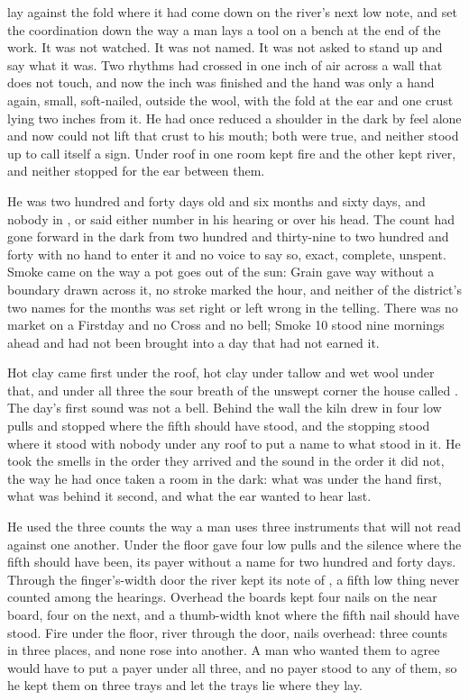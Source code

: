 
 lay against the fold where it had come down on the river's next low note, and  set the coordination down the way a man lays a tool on a bench at the end of the work. It was not watched. It was not named. It was not asked to stand up and say what it was. Two rhythms had crossed in one inch of air across a wall that does not touch, and now the inch was finished and the hand was only a hand again, small, soft-nailed, outside the wool, with the fold at the ear and one crust lying two inches from it. He had once reduced a shoulder in the dark by feel alone and now could not lift that crust to his mouth; both were true, and neither stood up to call itself a sign. Under  roof in  one room kept fire and the other kept river, and neither stopped for the ear between them.

He was two hundred and forty days old and six months and sixty days, and nobody in ,  or  said either number in his hearing or over his head. The count had gone forward in the dark from two hundred and thirty-nine to two hundred and forty with no hand to enter it and no voice to say so, exact, complete, unspent. Smoke came on the way a pot goes out of the sun: Grain gave way without a boundary drawn across it, no stroke marked the hour, and neither of the district's two names for the months was set right or left wrong in the telling. There was no market on a Firstday and no Cross and no bell; Smoke 10 stood nine mornings ahead and had not been brought into a day that had not earned it.

Hot clay came first under the roof, hot clay under tallow and wet wool under that, and under all three the sour  breath of the unswept corner the house called . The day's first sound was not a bell. Behind the wall the kiln drew in four low pulls and stopped where the fifth should have stood, and the stopping stood where it stood with nobody under any roof to put a name to what stood in it. He took the smells in the order they arrived and the sound in the order it did not, the way he had once taken a room in the dark: what was under the hand first, what was behind it second, and what the ear wanted to hear last.

He used the three counts the way a man uses three instruments that will not read against one another. Under the floor  gave four low pulls and the silence where the fifth should have been, its payer without a name for two hundred and forty days. Through the finger's-width door the river kept its note of , a fifth low thing never counted among the hearings. Overhead the boards kept four nails on the near board, four on the next, and a thumb-width knot where the fifth nail should have stood. Fire under the floor, river through the door, nails overhead: three counts in three places, and none rose into another. A man who wanted them to agree would have to put a payer under all three, and no payer stood to any of them, so he kept them on three trays and let the trays lie where they lay.

